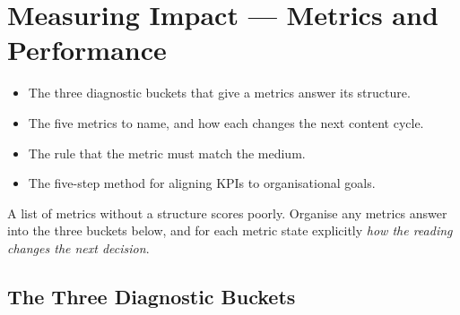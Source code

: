 \documentclass{MMTextbook}
\begin{document}
\chapter{Measuring Impact --- Metrics and Performance}


\begin{learningoutcomes}
\begin{itemize}
\item The three diagnostic buckets that give a metrics answer its structure.
\item The five metrics to name, and how each changes the next content cycle.
\item The rule that the metric must match the medium.
\item The five-step method for aligning KPIs to organisational goals.
\end{itemize}
\end{learningoutcomes}

\begin{keybox}
A list of metrics without a structure scores poorly. Organise any metrics answer
into the three buckets below, and for each metric state explicitly \emph{how the
reading changes the next decision}.
\end{keybox}

\section{The Three Diagnostic Buckets}
\end{document}
